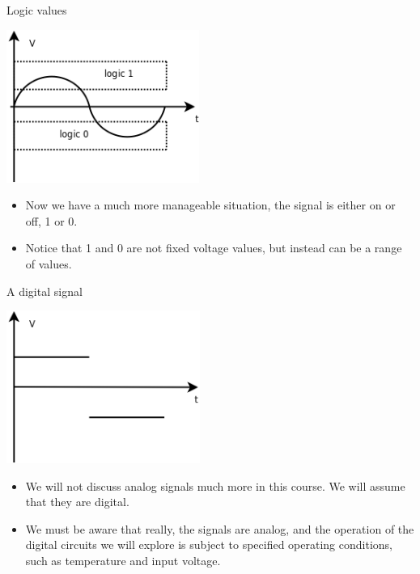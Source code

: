 \begin{frame}{Logic values}
  \begin{center}
    \includegraphics[height=5cm]{AnalogCurveWithLogicLevels.png}
  \end{center}
\end{frame}

\begin{itemize}
  \item Now we have a much more manageable situation, the signal is either on or off, 1 or 0.
  \item Notice that 1 and 0 are not fixed voltage values, but instead can be a range of values.
\end{itemize}

\begin{frame}{A digital signal}
  \begin{center}
    \includegraphics[height=5cm]{DigitalCurve.png}
  \end{center}
\end{frame}

\begin{itemize}
  \item We will not discuss analog signals much more in this course.  We will assume that they are digital.
  \item We must be aware that really, the signals are analog, and the operation of the digital circuits we will explore is subject to specified operating conditions, such as temperature and input voltage.
\end{itemize}

